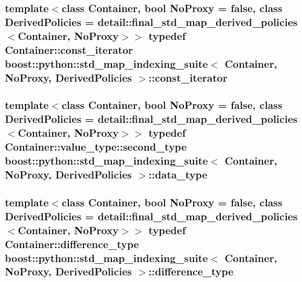 \subsubsection[{\texorpdfstring{const\+\_\+iterator}{const_iterator}}]{\setlength{\rightskip}{0pt plus 5cm}template$<$class Container, bool No\+Proxy = false, class Derived\+Policies = detail\+::final\+\_\+std\+\_\+map\+\_\+derived\+\_\+policies$<$\+Container, No\+Proxy$>$$>$ typedef Container\+::const\+\_\+iterator {\bf boost\+::python\+::std\+\_\+map\+\_\+indexing\+\_\+suite}$<$ Container, No\+Proxy, Derived\+Policies $>$\+::{\bf const\+\_\+iterator}}\hypertarget{classboost_1_1python_1_1std__map__indexing__suite_aae0c4473455223a4e048cc207ca7b3ea}{}\label{classboost_1_1python_1_1std__map__indexing__suite_aae0c4473455223a4e048cc207ca7b3ea}
\subsubsection[{\texorpdfstring{data\+\_\+type}{data_type}}]{\setlength{\rightskip}{0pt plus 5cm}template$<$class Container, bool No\+Proxy = false, class Derived\+Policies = detail\+::final\+\_\+std\+\_\+map\+\_\+derived\+\_\+policies$<$\+Container, No\+Proxy$>$$>$ typedef Container\+::value\+\_\+type\+::second\+\_\+type {\bf boost\+::python\+::std\+\_\+map\+\_\+indexing\+\_\+suite}$<$ Container, No\+Proxy, Derived\+Policies $>$\+::{\bf data\+\_\+type}}\hypertarget{classboost_1_1python_1_1std__map__indexing__suite_a3e9a6a8b8ba34759cf0ba99fe5966041}{}\label{classboost_1_1python_1_1std__map__indexing__suite_a3e9a6a8b8ba34759cf0ba99fe5966041}
\subsubsection[{\texorpdfstring{difference\+\_\+type}{difference_type}}]{\setlength{\rightskip}{0pt plus 5cm}template$<$class Container, bool No\+Proxy = false, class Derived\+Policies = detail\+::final\+\_\+std\+\_\+map\+\_\+derived\+\_\+policies$<$\+Container, No\+Proxy$>$$>$ typedef Container\+::difference\+\_\+type {\bf boost\+::python\+::std\+\_\+map\+\_\+indexing\+\_\+suite}$<$ Container, No\+Proxy, Derived\+Policies $>$\+::{\bf difference\+\_\+type}}\hypertarget{classboost_1_1python_1_1std__map__indexing__suite_a54aa644dcb3913334f8b0152901940ef}{}\label{classboost_1_1python_1_1std__map__indexing__suite_a54aa644dcb3913334f8b0152901940ef}
